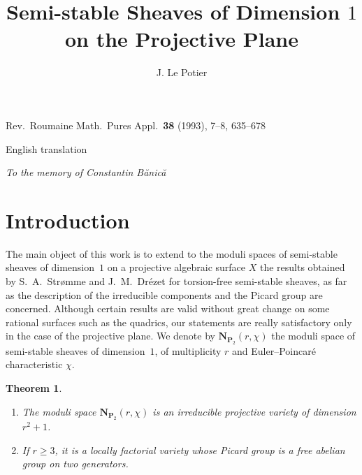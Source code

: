 \documentclass[12pt,english]{smfart}%
\title{Semi-stable Sheaves of Dimension $1$\\ on the Projective Plane}
\author{J. Le Potier}
\date{}
\theoremstyle{plain}
\newtheorem{theorem}{Theorem}[section]
\theoremstyle{definition}
\theoremstyle{remark}
\newcommand{\PP}{\mathbf{P}}
\newcommand{\NN}{\mathbf{N}}           %
\newcommand{\origpage}[1]{\marginnote{\scriptsize\itshape p.~#1}}
\begin{document}
\pagestyle{plain}

\maketitle
\begin{center}
{\normalsize Rev.\ Roumaine Math.\ Pures Appl.\ \textbf{38} (1993), 7--8, 635--678\par}
\vspace{2pt}
{\small English translation\par}
\end{center}

\begin{center}
\itshape To the memory of Constantin B\u{a}nic\u{a}
\end{center}

\medskip
\tableofcontents
\medskip

\section{Introduction}\label{sec:introduction}
\origpage{635}

The main object of this work is to extend to the moduli spaces of semi-stable sheaves of dimension~$1$ on a projective algebraic surface $X$ the results obtained by S.~A.~Str\o mme \cite{Str} and J.~M.~Dr\'ezet \cite{Dre1} for torsion-free semi-stable sheaves, as far as the description of the irreducible components and the Picard group are concerned. Although certain results are valid without great change on some rational surfaces such as the quadrics, our statements are really satisfactory only in the case of the projective plane. We denote by $\NN_{\PP_{2}}(r,\chi)$ the moduli space of semi-stable sheaves of dimension~$1$, of multiplicity $r$ and Euler--Poincar\'e characteristic $\chi$.

\begin{theorem}\label{thm:main}
\begin{enumerate}
\item The moduli space $\NN_{\PP_{2}}(r,\chi)$ is an irreducible projective variety of dimension $r^{2}+1$.
\item If $r\geq 3$, it is a locally factorial variety whose Picard group is a free abelian group on two generators.
\end{enumerate}
\end{theorem}
\end{document}

